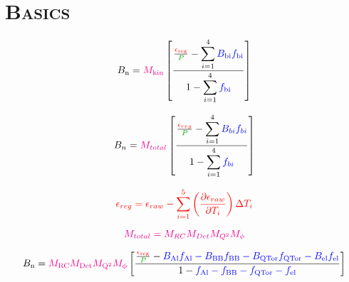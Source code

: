 \documentclass[xcolor=x11names,compress,8pt]{beamer}
\renewcommand{\(}{\begin{columns}}
\renewcommand{\)}{\end{columns}}
\newcommand{\<}[1]{\begin{column}{#1}}
\renewcommand{\>}{\end{column}}
\begin{document}
\section{\scshape Basics}
\begin{frame}

\begin{equation} \label{equ:eqPhysicsAsymmetry101}
\textcolor{black}{B_{\rm n}} = \textcolor{magenta}{M_{\rm kin}} \left[ \frac{\frac{\textcolor{red}{\epsilon_{\rm reg}}}{\textcolor{darkgreen}{P}} - \displaystyle\sum_{i=1}^{4} \textcolor{blue}{B_{\rm bi}f_{\rm bi}} }{1 - \displaystyle\sum_{i=1}^{4}\textcolor{blue}{f_{\rm bi}}} \right] 
\end{equation}

\begin{equation} \label{equ:eqPhysicsAsymmetry101}
\textcolor{black}{B_{n}} = \textcolor{magenta}{M_{total}} \left[ \frac{\frac{\textcolor{red}{\epsilon_{reg}}}{\textcolor{darkgreen}{P}} - \displaystyle\sum_{i=1}^{4} \textcolor{blue}{B_{bi}f_{bi}} }{1 - \displaystyle\sum_{i=1}^{4}\textcolor{blue}{f_{bi}}} \right] 
\end{equation}

\begin{equation} \label{equ:eqPhysicsAsymmetry102}
\textcolor{red}{\epsilon_{reg} = \epsilon_{raw} - \displaystyle\sum_{i=1}^{5} \left(\frac{\partial \epsilon_{raw}}{\partial T_{i}}\right)\Delta T_{i}  }
\end{equation}

\begin{equation} \label{equ:eqPhysicsAsymmetry103}
\textcolor{magenta}{M_{total} = M_{RC}M_{Det}M_{Q^{2}}M_{\phi}}
\end{equation}

\begin{equation} \label{equ:eqPhysicsAsymmetry104}
\textcolor{black}{B_{\rm n}} = \textcolor{magenta}{M_{\rm RC}M_{\rm Det}M_{\rm Q^{2}}M_{\rm\phi}} \left[ \frac{\frac{\textcolor{red}{\epsilon_{\rm reg}}}{\textcolor{darkgreen}{P}} - \textcolor{blue}{ B_{\rm Al}f_{\rm Al} - B_{\rm BB}f_{\rm BB} - B_{\rm QTor}f_{\rm QTor} - B_{\rm el}f_{\rm el} } }{1 - \textcolor{blue}{ f_{\rm Al} - f_{\rm BB} - f_{\rm QTor} - f_{\rm el} }} \right] 
\end{equation}


\end{frame}
\end{document}
